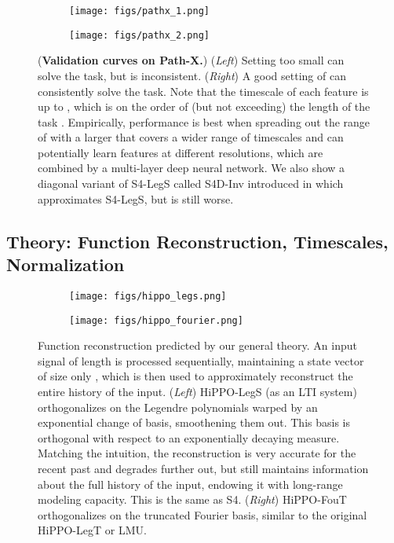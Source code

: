 \documentclass{article}
\begin{document}
\begin{figure}[!ht]
  \begin{subfigure}{.5\linewidth}\centering
    \texttt{[image: figs/pathx\_1.png]}
  \end{subfigure}
  \begin{subfigure}{.5\linewidth}\centering
    \texttt{[image: figs/pathx\_2.png]}
  \end{subfigure}

  \caption{
    (\textbf{Validation curves on Path-X.})
    (\emph{Left}) Setting  too small can solve the task, but is inconsistent.
    (\emph{Right}) A good setting of  can consistently solve the task. Note that the timescale of each feature is up to , which is on the order of (but not exceeding) the length of the task .
    Empirically, performance is best when spreading out the range of  with a larger  that covers a wider range of timescales and can potentially learn features at different resolutions, which are combined by a multi-layer deep neural network.
    We also show a diagonal variant of S4-LegS called S4D-Inv introduced in \citep{gu2022s4d} which approximates S4-LegS, but is still worse.
  }
    \label{fig:pathx}
\end{figure}

\subsection{Theory: Function Reconstruction, Timescales, Normalization}
\label{sec:experiments:reconstruction}


\begin{figure}[!t]
  \begin{subfigure}{.5\linewidth}\centering
    \texttt{[image: figs/hippo\_legs.png]}
  \end{subfigure}
  \begin{subfigure}{.5\linewidth}\centering
    \texttt{[image: figs/hippo\_fourier.png]}
  \end{subfigure}
  \caption{
    Function reconstruction predicted by our general theory.
    An input signal of length  is processed sequentially,
    maintaining a state vector of size only ,
    which is then used to approximately reconstruct the entire history of the input.
    (\emph{Left}) HiPPO-LegS (as an LTI system) orthogonalizes on the Legendre polynomials warped by an exponential change of basis, smoothening them out. This basis is orthogonal with respect to an exponentially decaying measure.
    Matching the intuition, the reconstruction is very accurate for the recent past and degrades further out, but still maintains information about the full history of the input, endowing it with long-range modeling capacity.
    This is the same as S4.
    (\emph{Right}) HiPPO-FouT orthogonalizes on the truncated Fourier basis, similar to the original HiPPO-LegT or LMU.
  }
  \label{fig:reconstruction-new}
\end{figure}
\end{document}
